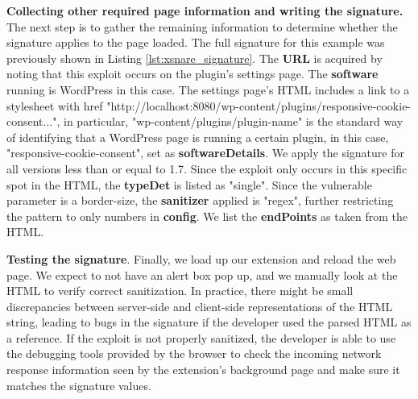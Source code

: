 \textbf{Collecting other required page information and writing the signature.} The next step is to gather the remaining information to determine whether the signature applies to the page loaded. The full signature for this example was previously shown in Listing \ref{lst:xsnare_signature}. The \textbf{URL} is acquired by noting that this exploit occurs on the plugin's settings page. The \textbf{software} running is WordPress in this case. The settings page's HTML includes a link to a stylesheet with href "http://localhost:8080/wp-content/plugins/responsive-cookie-consent...", in particular, "wp-content/plugins/plugin-name" is the standard way of identifying that a WordPress page is running a certain plugin, in this case, "responsive-cookie-consent", set as \textbf{softwareDetails}. We apply the signature for all versions less than or equal to 1.7. Since the exploit only occurs in this specific spot in the HTML, the \textbf{typeDet} is listed as "single". 
Since the vulnerable parameter is a border-size, the \textbf{sanitizer} applied is "regex", further restricting the pattern to only numbers in \textbf{config}. We list the \textbf{endPoints} as taken from the HTML.

\textbf{Testing the signature}. Finally, we load up our extension and reload the web page. We expect to not have an alert box pop up, and we manually look at the HTML to verify correct sanitization. In practice, there might be small discrepancies between server-side and client-side representations of the HTML string, leading to bugs in the signature if the developer used the parsed HTML as a reference. If the exploit is not properly sanitized, the developer is able to use the debugging tools provided by the browser to check the incoming network response information seen by the extension's background page and make sure it matches the signature values.

\iffalse
